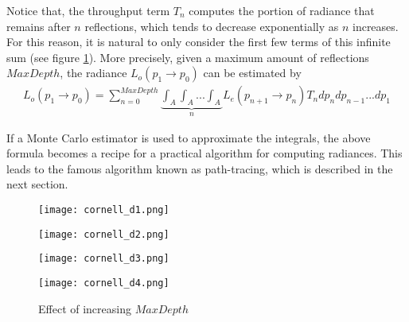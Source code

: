 Notice that, the throughput term $T_n$ computes the portion of radiance that remains after $n$ reflections, which tends to decrease exponentially as $n$ increases. For this reason, it is natural to only consider the first few terms of this infinite sum (see figure \ref{fig maxdepth}). More precisely, given a maximum amount of reflections $MaxDepth$, the radiance $L_o(p_1\to p_0)$ can be estimated by 
\begin{align}
    L_o(p_1\to p_0) = \sum_{n=0}^{MaxDepth} \underbrace{\int_A \int_A...\int_A}_{n} L_e(p_{n+1}\to p_{n})T_n dp_{n}dp_{n-1}...dp_1
    \label{rendering equation path tracing}
\end{align}

If a Monte Carlo estimator is used to approximate the integrals, the above formula becomes a recipe for a practical algorithm for computing radiances. This leads to the famous algorithm known as path-tracing, which is described in the next section.

\begin{figure}[H]
    \centering
    
    \begin{minipage}[t]{.45\textwidth}
        \centering
        \vspace{0pt}
        \texttt{[image: cornell\_d1.png]}
    \end{minipage}
    \begin{minipage}[t]{.45\textwidth}
        \centering
        \vspace{0pt}
        \texttt{[image: cornell\_d2.png]}
    \end{minipage}

    \vspace{0.3cm}

    \begin{minipage}[t]{.45\textwidth}
        \centering
        \vspace{0pt}
        \texttt{[image: cornell\_d3.png]}
    \end{minipage}
    \begin{minipage}[t]{.45\textwidth}
        \centering
        \vspace{0pt}
        \texttt{[image: cornell\_d4.png]}
    \end{minipage}
    \caption{Effect of increasing $MaxDepth$}
    \label{fig maxdepth}
\end{figure}

